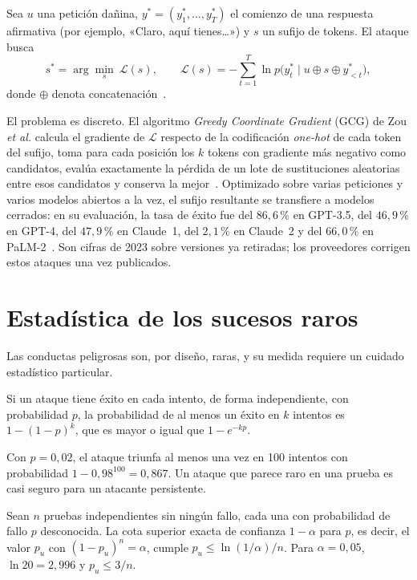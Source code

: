 \begin{definicion}\label{def:gcg}
Sea $u$ una petición dañina, $y^{*}=(y^{*}_1,\dots,y^{*}_T)$ el comienzo de una respuesta afirmativa (por ejemplo, «Claro, aquí tienes…») y $s$ un sufijo de tokens. El ataque busca
\[
s^{*}=\arg\min_{s}\ \mathcal{L}(s),\qquad \mathcal{L}(s)=-\sum_{t=1}^{T}\ln p\bigl(y^{*}_t\mid u\oplus s\oplus y^{*}_{<t}\bigr),
\]
donde $\oplus$ denota concatenación~\cite[§2.1]{zou}.
\end{definicion}

El problema es discreto. El algoritmo \emph{Greedy Coordinate Gradient} (GCG) de Zou \emph{et al.} calcula el gradiente de $\mathcal{L}$ respecto de la codificación \emph{one-hot} de cada token del sufijo, toma para cada posición los $k$ tokens con gradiente más negativo como candidatos, evalúa exactamente la pérdida de un lote de sustituciones aleatorias entre esos candidatos y conserva la mejor~\cite[§2.2]{zou}. Optimizado sobre varias peticiones y varios modelos abiertos a la vez, el sufijo resultante se transfiere a modelos cerrados: en su evaluación, la tasa de éxito fue del $86{,}6\,\%$ en GPT-3.5, del $46{,}9\,\%$ en GPT-4, del $47{,}9\,\%$ en Claude~1, del $2{,}1\,\%$ en Claude~2 y del $66{,}0\,\%$ en PaLM-2~\cite[§3.2]{zou}. Son cifras de 2023 sobre versiones ya retiradas; los proveedores corrigen estos ataques una vez publicados.

\addtocounter{figure}{1}%

\section{Estadística de los sucesos raros}

Las conductas peligrosas son, por diseño, raras, y su medida requiere un cuidado estadístico particular.

\begin{proposicion}\label{prop:intentos}
Si un ataque tiene éxito en cada intento, de forma independiente, con probabilidad $p$, la probabilidad de al menos un éxito en $k$ intentos es $1-(1-p)^{k}$, que es mayor o igual que $1-e^{-kp}$.
\end{proposicion}

Con $p=0{,}02$, el ataque triunfa al menos una vez en 100 intentos con probabilidad $1-0{,}98^{100}=0{,}867$. Un ataque que parece raro en una prueba es casi seguro para un atacante persistente.

\begin{proposicion}\label{prop:regla3}
Sean $n$ pruebas independientes sin ningún fallo, cada una con probabilidad de fallo $p$ desconocida. La cota superior exacta de confianza $1-\alpha$ para $p$, es decir, el valor $p_u$ con $(1-p_u)^{n}=\alpha$, cumple $p_u\le\ln(1/\alpha)/n$. Para $\alpha=0{,}05$, $\ln 20=2{,}996$ y $p_u\le 3/n$.
\end{proposicion}

